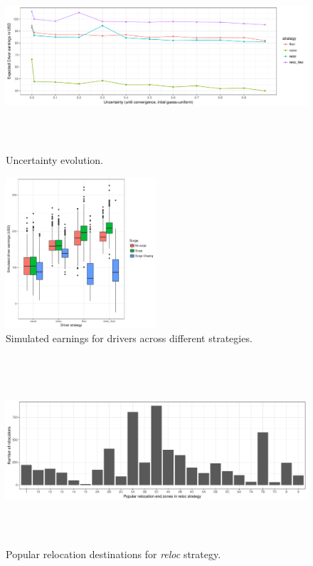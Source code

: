 \begin{figure}
	\label{fig:uncertainty_evolution}
	\caption{Uncertainty evolution.}
	\includegraphics[width=\textwidth,height=7cm]{figures/uncertainty_evolution.pdf}
\end{figure}

\begin{figure}
	\label{fig:simulated_earnings}
	\caption{Simulated earnings for drivers across different strategies.}
	\includegraphics[width=0.5\textwidth,height=0.4\textwidth]{figures/simulated_earnings.pdf}
\end{figure}

\begin{figure}
	\label{fig:reloc_end_zones}
	\caption{Popular relocation destinations for \textit{reloc} strategy.}
	\includegraphics[width=\textwidth,height=7cm]{figures/reloc_end_zones.pdf}
\end{figure}

